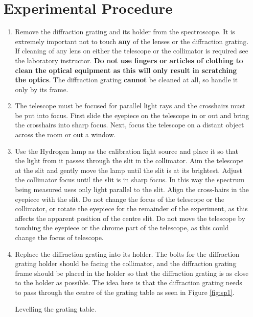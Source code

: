 \section{Experimental Procedure}
\begin{enumerate}

\item Remove the diffraction grating and its holder from the spectroscope. It is extremely important not to touch {\bf any} of the lenses or the diffraction grating. If cleaning of any lens on either the telescope or the collimator is required see the laboratory instructor. {\bf Do not use fingers or articles of clothing to clean the optical equipment as this will only result in scratching the optics}. The diffraction grating {\bf cannot} be cleaned at all, so handle it only by its frame.

\item The telescope must be focused for parallel light rays and the crosshairs must be put into focus. First slide the eyepiece on the telescope in or out and bring the crosshairs into sharp focus. Next, focus the telescope on a distant object across the room or out a window.

\item Use the Hydrogen lamp as the calibration light source and place it so that the light from it passes through the slit in the collimator. Aim the telescope at the slit and gently move the lamp until the slit is at its brightest. Adjust the collimator focus until the slit is in sharp focus. In this way the spectrum being measured uses only light parallel to the slit. Align the cross-hairs in the eyepiece with the slit. Do not change the focus of the telescope or the collimator, or rotate the eyepiece for the remainder of the experiment, as this affects the apparent position of the centre slit. Do not move the telescope by touching the eyepiece or the chrome part of the telescope, as this could change the focus of telescope.  

\item Replace the diffraction grating into its holder. The bolts for the diffraction grating holder should be facing the collimator, and the diffraction grating frame should be placed in the holder so that the diffraction grating is as close to the holder as possible. The idea here is that the diffraction grating needs to pass through the centre of the grating table as seen in Figure \ref{fig:sp1}. 

\begin{marginfigure}
\caption{Levelling the grating table.}
\label{fig:sp3}
\end{marginfigure}


\end{enumerate}
